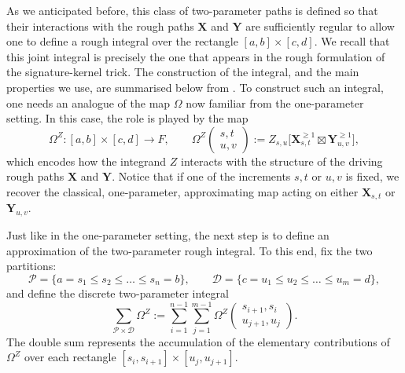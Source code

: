 \documentclass{article}%
\begin{document}
As we anticipated before, this class of two-parameter paths is defined so that their interactions with the rough paths $\mathbf{X}$ and $\mathbf{Y}$ are sufficiently regular to allow one to define a rough integral over the rectangle $[a,b]\times[c,d]$. We recall that this joint integral is precisely the one that appears in the rough formulation of the signature-kernel trick. The construction of the integral, and the main properties we use, are summarised below from \cite{cass2023fubini}.\newline
To construct such an integral, one needs an analogue of the map $\Omega$ now familiar from the one-parameter setting. 
In this case, the role is played by the map  
\[
\Omega^Z: [a,b] \times [c,d] \to F, \qquad \Omega^Z \begin{pmatrix} s,t \\ u,v \end{pmatrix} := 
Z_{s,u} \big[ \mathbf{X}^{\geq 1}_{s,t} \boxtimes \mathbf{Y}^{\geq 1}_{u,v} \big],
\]  
which encodes how the integrand \(Z\) interacts with the structure of the driving rough paths \(\mathbf{X}\) and \(\mathbf{Y}\). 
Notice that if one of the increments $s,t$ or $u,v$ is fixed, we recover the classical, one-parameter, approximating map acting on either \(\mathbf{X}_{s,t}\) or \(\mathbf{Y}_{u,v}\).

Just like in the one-parameter setting, the next step is to define an approximation of the two-parameter rough integral. 
To this end, fix the two partitions:  
\[
\mathcal{P} = \{ a = s_1 \leq s_2 \leq \dots \leq s_n = b \}, 
\qquad  
\mathcal{D} = \{ c = u_1 \leq u_2 \leq \dots \leq u_m = d \},
\]  
and define the discrete two-parameter integral  
\begin{equation}\label{two_param_sewing}
\sum_{\mathcal{P}\times \mathcal{D}} \Omega^Z 
   := \sum_{i=1}^{n-1} \sum_{j=1}^{m-1} 
   \Omega^Z \begin{pmatrix} s_{i+1}, s_i \\ u_{j+1}, u_j \end{pmatrix}.
\end{equation}  
The double sum represents the accumulation of the elementary contributions of \(\Omega^Z\) over each rectangle \([s_i,s_{i+1}]\times[u_j,u_{j+1}]\). 
\end{document}

